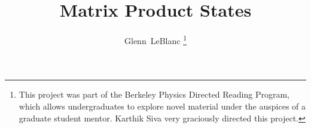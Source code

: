 \documentclass[12pt]{article}
\begin{document}


\title{Matrix Product States}
%
%
%
\author{Glenn~LeBlanc
\thanks{This project was part of the Berkeley Physics Directed
Reading Program, which allows undergraduates to explore novel
material under the auspices of a graduate student mentor. Karthik Siva
very graciously directed this project.}}

\maketitle
\end{document}
